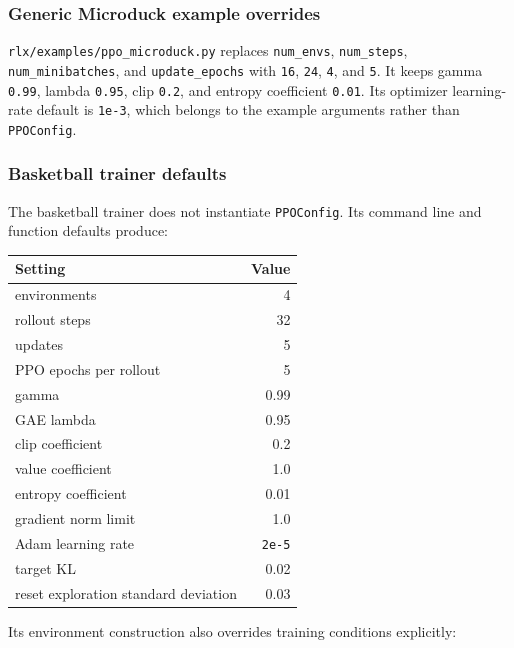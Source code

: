 \documentclass[
  american,
  11pt,
  letterpaper,
]{article}
\newcounter{none} %
\begin{document}
\subsubsection{Generic Microduck example
overrides}\label{generic-microduck-example-overrides}

\texttt{rlx/\allowbreak{}examples\allowbreak{}/\allowbreak{}ppo\_\allowbreak{}microduc\allowbreak{}k.py}
replaces \texttt{num\_envs}, \texttt{num\_steps},
\texttt{num\_\allowbreak{}minibatc\allowbreak{}hes}, and
\texttt{update\_\allowbreak{}epochs} with \texttt{16}, \texttt{24},
\texttt{4}, and \texttt{5}. It keeps gamma \texttt{0.99}, lambda
\texttt{0.95}, clip \texttt{0.2}, and entropy coefficient \texttt{0.01}.
Its optimizer learning-rate default is \texttt{1e-3}, which belongs to
the example arguments rather than \texttt{PPOConfig}.

\subsubsection{Basketball trainer
defaults}\label{basketball-trainer-defaults}

The basketball trainer does not instantiate \texttt{PPOConfig}. Its
command line and function defaults produce:

{\def\LTcaptype{none} %
\begin{longtable}[]{@{}lr@{}}
\toprule\noalign{}
Setting & Value \\
\midrule\noalign{}
\endhead
\bottomrule\noalign{}
\endlastfoot
environments & 4 \\
rollout steps & 32 \\
updates & 5 \\
PPO epochs per rollout & 5 \\
gamma & 0.99 \\
GAE lambda & 0.95 \\
clip coefficient & 0.2 \\
value coefficient & 1.0 \\
entropy coefficient & 0.01 \\
gradient norm limit & 1.0 \\
Adam learning rate & \texttt{2e-5} \\
target KL & 0.02 \\
reset exploration standard deviation & 0.03 \\
\end{longtable}
}

Its environment construction also overrides training conditions
explicitly:
\end{document}
